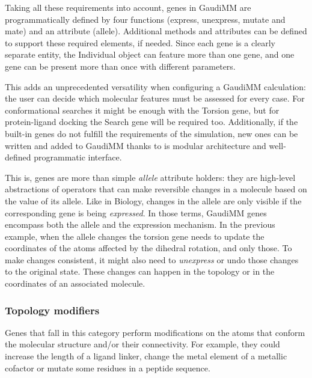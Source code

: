 Taking all these requirements into account, genes in GaudiMM are programmatically defined by four functions (express, unexpress, mutate and mate) and an attribute (allele). Additional methods and attributes can be defined to support these required elements, if needed. Since each gene is a clearly separate entity, the Individual object can feature more than one gene, and one gene can be present more than once with different parameters.

This adds an unprecedented versatility when configuring a GaudiMM calculation: the user can decide which molecular features must be assessed for every case. For conformational searches it might be enough with the Torsion gene, but for protein-ligand docking the Search gene will be required too. Additionally, if the built-in genes do not fulfill the requirements of the simulation, new ones can be written and added to GaudiMM thanks to is modular architecture and well-defined programmatic interface.

This is, genes are more than simple \textit{allele} attribute holders: they are high-level abstractions of operators that can make reversible changes in a molecule based on the value of its allele. Like in Biology, changes in the allele are only visible if the corresponding gene is being \textit{expressed}. In those terms, GaudiMM genes encompass both the allele and the expression mechanism. In the previous example, when the allele changes the torsion gene needs to update the coordinates of the atoms affected by the dihedral rotation, and only those. To make changes consistent, it might also need to \textit{unexpress} or undo those changes to the original state. These changes can happen in the topology or in the coordinates of an associated molecule.

\subsubsection{Topology modifiers}
Genes that fall in this category perform modifications on the atoms that conform the molecular structure and/or their connectivity. For example, they could increase the length of a ligand linker, change the metal element of a metallic cofactor or mutate some residues in a peptide sequence.

